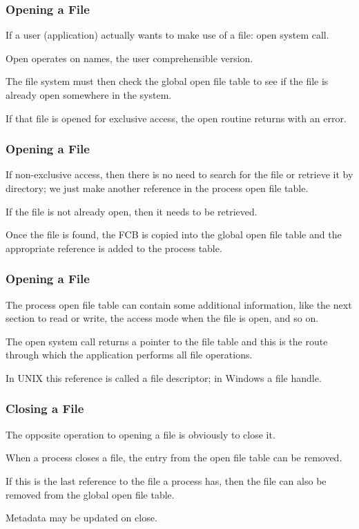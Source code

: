 \begin{frame}
\frametitle{Opening a File}

If a user (application) actually wants to make use of a file: open system call. 

Open operates on names, the user comprehensible version. 

The file system must then check the global open file table to see if the file is already open somewhere in the system. 

If that file is opened for exclusive access, the open routine returns with an error. 

\end{frame}

\begin{frame}
\frametitle{Opening a File}

If non-exclusive access, then there is no need to search for the file or retrieve it by directory; we just make another reference in the process open file table. 

If the file is not already open, then it needs to be retrieved. 

Once the file is found, the FCB is copied into the global open file table and the appropriate reference is added to the process table.

\end{frame}

\begin{frame}
\frametitle{Opening a File}

The process open file table can contain some additional information, like the next section to read or write, the access mode when the file is open, and so on. 

The open system call returns a pointer to the file table and this is the route through which the application performs all file operations. 

In UNIX this reference is called a \alert{file descriptor}; in Windows a \alert{file handle}.


\end{frame}

\begin{frame}
\frametitle{Closing a File}

The opposite operation to opening a file is obviously to close it. 

When a process closes a file, the entry from the open file table can be removed. 

If this is the last reference to the file a process has, then the file can also be removed from the global open file table. 

Metadata may be updated on close.

\end{frame}



